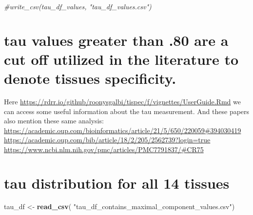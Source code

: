 \documentclass[
]{article}
\newenvironment{Shaded}{\begin{snugshade}}{\end{snugshade}}
\newcommand{\CommentTok}[1]{\textcolor[rgb]{0.56,0.35,0.01}{\textit{#1}}}
\newcommand{\FloatTok}[1]{\textcolor[rgb]{0.00,0.00,0.81}{#1}}
\newcommand{\FunctionTok}[1]{\textcolor[rgb]{0.13,0.29,0.53}{\textbf{#1}}}
\newcommand{\NormalTok}[1]{#1}
\newcommand{\OtherTok}[1]{\textcolor[rgb]{0.56,0.35,0.01}{#1}}
\newcommand{\SpecialCharTok}[1]{\textcolor[rgb]{0.81,0.36,0.00}{\textbf{#1}}}
\newcommand{\StringTok}[1]{\textcolor[rgb]{0.31,0.60,0.02}{#1}}
\begin{document}
\begin{Shaded}
\begin{Highlighting}[]
\CommentTok{\#write\_csv(tau\_df\_values, "tau\_df\_values.csv")}
\end{Highlighting}
\end{Shaded}

\hypertarget{tau-values-greater-than-.80-are-a-cut-off-utilized-in-the-literature-to-denote-tissues-specificity.}{%
\section{tau values greater than .80 are a cut off utilized in the
literature to denote tissues
specificity.}\label{tau-values-greater-than-.80-are-a-cut-off-utilized-in-the-literature-to-denote-tissues-specificity.}}

\begin{Shaded}
\end{Shaded}

Here
\url{https://rdrr.io/github/roonysgalbi/tispec/f/vignettes/UserGuide.Rmd}
we can access some useful information about the tau measurement. And
these papers also mention these same analysis:
\url{https://academic.oup.com/bioinformatics/article/21/5/650/220059\#394030419}
\url{https://academic.oup.com/bib/article/18/2/205/2562739?login=true}
\url{https://www.ncbi.nlm.nih.gov/pmc/articles/PMC7791837/\#CR75}

\hypertarget{tau-distribution-for-all-14-tissues}{%
\section{tau distribution for all 14
tissues}\label{tau-distribution-for-all-14-tissues}}

\begin{Shaded}
\begin{Highlighting}[]
\NormalTok{tau\_df }\OtherTok{\textless{}{-}} \FunctionTok{read\_csv}\NormalTok{( }\StringTok{"tau\_df\_contains\_maximal\_component\_values.csv"}\NormalTok{)}
\end{Highlighting}
\end{Shaded}
\end{document}
